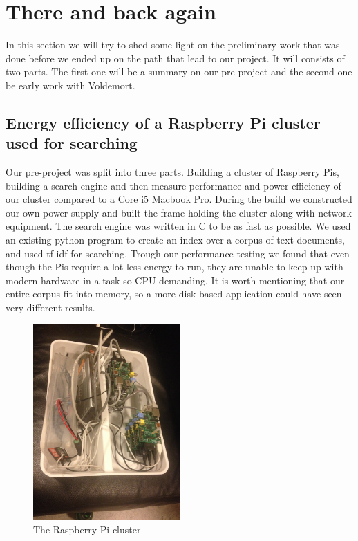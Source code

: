 \section{There and back again}
In this section we will try to shed some light on the preliminary work that was done before we ended up on the path that lead to our project. It will consists of two parts. The first one will be a summary on our pre-project and the second one be early work with Voldemort.

\subsection{Energy efficiency of a Raspberry Pi cluster used for searching}
Our pre-project was split into three parts. Building a cluster of Raspberry Pis, building a search engine and then measure performance and power efficiency of our cluster compared to a Core i5 Macbook Pro. During the build we constructed our own power supply and built the frame holding the cluster along with network equipment. The search engine was written in C to be as fast as possible. We used an existing python program to create an index over a corpus of text documents, and used tf-idf for searching. Trough our performance testing we found that even though the Pis require a lot less energy to run, they are unable to keep up with modern hardware in a task so CPU demanding. It is worth mentioning that our entire corpus fit into memory, so a more disk based application could have seen very different results.

\begin{figure}[h]
    \centering
    \includegraphics[width=0.5\textwidth]{thereandbackagain/cluster_beautiful.jpg}
    \caption{The Raspberry Pi cluster}
    \label{fig:cluster}
\end{figure}

